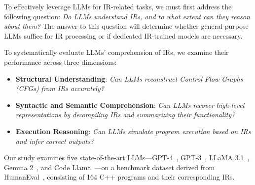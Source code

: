 To effectively leverage LLMs for IR-related tasks, we must first address the following question:
\emph{Do LLMs understand IRs, and to what extent can they reason about them?} 
The answer to this question will determine whether general-purpose LLMs suffice for IR processing or if dedicated IR-trained models are necessary.


To systematically evaluate LLMs' comprehension of IRs, we examine their performance across three dimensions:
\begin{itemize}[nolistsep,left=0pt]
\renewcommand{\labelitemi}{$\triangleright$}
\item \textbf{Structural Understanding}: \emph{Can LLMs reconstruct Control Flow Graphs (CFGs) from IRs accurately?}
\item \textbf{Syntactic and Semantic Comprehension}: \emph{Can LLMs recover high-level representations by decompiling IRs and summarizing their functionality?}
\item \textbf{Execution Reasoning}: \emph{Can LLMs simulate program execution based on IRs and infer correct outputs?}
\end{itemize}

Our study examines five state-of-the-art LLMs—GPT-4~\cite{openai2023gpt4}, GPT-3~\cite{brown2020gpt3}, LLaMA 3.1~\cite{touvron2023llama}, Gemma 2~\cite{team2024gemma}, and Code Llama~\cite{rozière2024codellamaopenfoundation}—on a benchmark dataset derived from HumanEval~\cite{zheng2023codegeex}, consisting of 164 C++ programs and their corresponding IRs.




